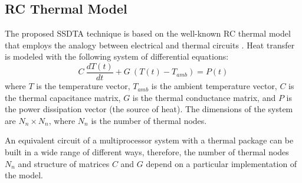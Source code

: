 \subsection{RC Thermal Model}
The proposed SSDTA technique is based on the well-known RC thermal model that employs the analogy between electrical and thermal circuits \cite{kreith2000}. Heat transfer is modeled with the following system of differential equations:
\begin{equation} \label{eq:fourier-model}
  C \: \frac{dT(t)}{dt} + G \: (T(t) - T_{amb})= P(t)
\end{equation}
where $T$ is the temperature vector, $T_{amb}$ is the ambient temperature vector, $C$ is the thermal capacitance matrix, $G$ is the thermal conductance matrix, and $P$ is the power dissipation vector (the source of heat). The dimensions of the system are $N_n \times N_n$, where $N_n$ is the number of thermal nodes.

An equivalent circuit of a multiprocessor system with a thermal package can be built in a wide range of different ways, therefore, the number of thermal nodes $N_n$ and structure of matrices $C$ and $G$ depend on a particular implementation of the model.
